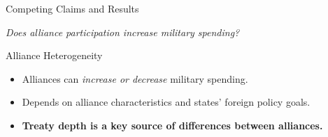 \documentclass[12pt]{beamer}
\begin{document}
\begin{frame}{Competing Claims and Results}

\begin{table}[hbt!]
\begin{center}
\end{center} 
\end{table}


\end{frame}
 


\begin{frame}[standout]

\huge \textit{Does alliance participation increase military spending?} 

\end{frame}


\begin{frame}{Alliance Heterogeneity}


\begin{itemize}
\item Alliances can \textit{increase or decrease} military spending. 
\pause
\item Depends on alliance characteristics and states' foreign policy goals.  
\pause 
\item \textbf{Treaty depth is a key source of differences between alliances.}
\end{itemize} 

\end{frame}
\end{document}
